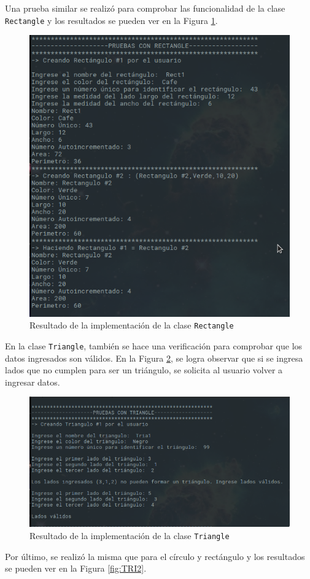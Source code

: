 Una prueba similar se realizó para comprobar las funcionalidad de la clase \texttt{Rectangle} y los resultados se pueden ver en la Figura \ref{fig:RECT}.

\begin{figure}[H]
\centering
\includegraphics[width=.7\textwidth]{imgs/Labo3/RECT}
\caption{Resultado de la implementación de la clase \texttt{Rectangle}}
\label{fig:RECT}
\end{figure}

En la clase \texttt{Triangle}, también se hace una verificación para comprobar que los datos ingresados son válidos. En la Figura \ref{fig:TRI1}, se logra observar que si se ingresa lados que no cumplen para ser un triángulo, se solicita al usuario volver a ingresar datos.

\begin{figure}[H]
\centering
\includegraphics[width=.7\textwidth]{imgs/Labo3/TRI1}
\caption{Resultado de la implementación de la clase \texttt{Triangle}}
\label{fig:TRI1}
\end{figure}

Por último, se realizó la misma que para el círculo y rectángulo y los resultados se pueden ver en la Figura \ref{fig:TRI2}.


